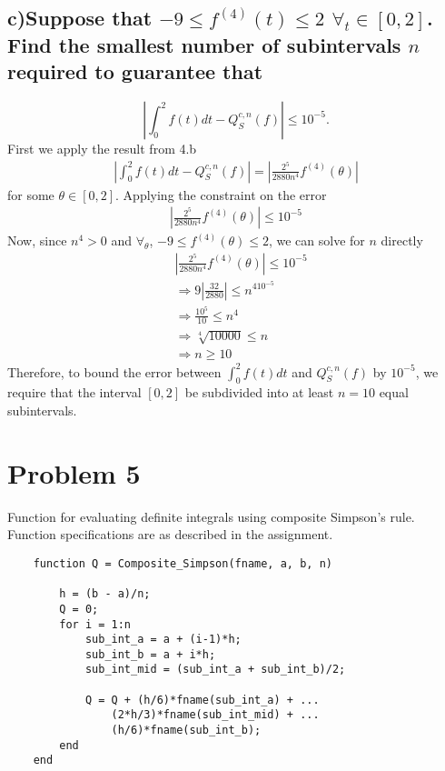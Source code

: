 \documentclass[11pt, letterpaper]{article}
\begin{document}
\subsection*{c)\normalfont Suppose that $-9\leq f^{(4)}(t)\leq 2$ $\forall_t\in[0,2]$. Find the smallest number of 
subintervals $n$ required to guarantee that}
\[\left|\int_0^2f(t)dt-Q_S^{c,n}(f)\right|\leq10^{-5}.\]
First we apply the result from 4.b
\begin{align*}
    \left|\int_0^2f(t)dt-Q_S^{c,n}(f)\right|=\left|\frac{2^5}{2880n^4}f^{(4)}(\theta)\right|
\end{align*}
for some $\theta\in[0,2]$. Applying the constraint on the error
\begin{align*}
    \left|\frac{2^5}{2880n^4}f^{(4)}(\theta)\right|\leq 10^{-5}
\end{align*}
Now, since $n^4>0$ and $\forall_{\theta}$, $-9\leq f^{(4)}(\theta)\leq 2$, we can solve for $n$ directly
\begin{align*}
    &\left|\frac{2^5}{2880n^4}f^{(4)}(\theta)\right|\leq 10^{-5}\\
    &\Rightarrow 9\left|\frac{32}{2880}\right|\leq n^410^{-5}\\
    &\Rightarrow \frac{10^5}{10}\leq n^{4}\\
    &\Rightarrow \sqrt[4]{10000}\leq n\\
    &\Rightarrow n\geq 10
\end{align*}
Therefore, to bound the error between $\int_0^2 f(t)dt$ and $Q_S^{c,n}(f)$ by $10^{-5}$, we require that the interval $[0,2]$ be subdivided
into at least $n=10$ equal subintervals. 
\newpage
\section*{Problem 5}
Function for evaluating definite integrals using composite Simpson's rule. Function specifications are as described in 
the assignment.
\begin{verbatim}
    function Q = Composite_Simpson(fname, a, b, n)

        h = (b - a)/n;
        Q = 0; 
        for i = 1:n
            sub_int_a = a + (i-1)*h; 
            sub_int_b = a + i*h; 
            sub_int_mid = (sub_int_a + sub_int_b)/2; 
            
            Q = Q + (h/6)*fname(sub_int_a) + ...
                (2*h/3)*fname(sub_int_mid) + ...
                (h/6)*fname(sub_int_b); 
        end
    end
\end{verbatim} 
\end{document}
